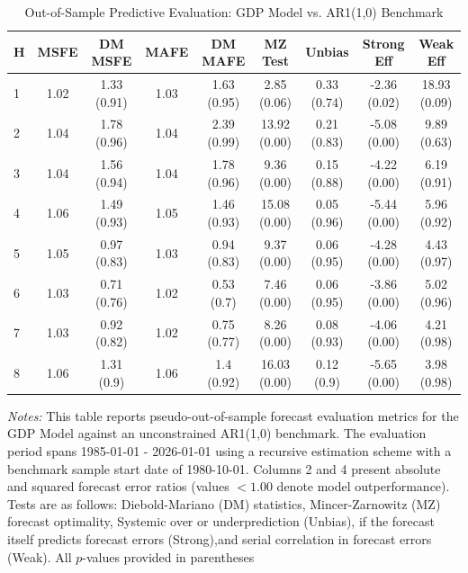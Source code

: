 \begin{table}[htbp]
\centering
\caption{Out-of-Sample Predictive Evaluation: GDP Model vs. AR1(1,0) Benchmark}
\label{tab:gdp_model_evaluation}
\footnotesize
\begin{tabular}{l cccccccc}
\hline\hline
\rule{0pt}{3ex}
\textbf{H} & \textbf{MSFE} & \textbf{DM MSFE} & \textbf{MAFE} & \textbf{DM MAFE} & \textbf{MZ Test} & \textbf{Unbias} & \textbf{Strong Eff} & \textbf{Weak Eff} \\[0.5ex]
\hline
\rule{0pt}{2.5ex}
1 & 1.02 & 1.33 (0.91) & 1.03 & 1.63 (0.95) & 2.85 (0.06) & 0.33 (0.74) & -2.36 (0.02) & 18.93 (0.09) \\
2 & 1.04 & 1.78 (0.96) & 1.04 & 2.39 (0.99) & 13.92 (0.00) & 0.21 (0.83) & -5.08 (0.00) & 9.89 (0.63) \\
3 & 1.04 & 1.56 (0.94) & 1.04 & 1.78 (0.96) & 9.36 (0.00) & 0.15 (0.88) & -4.22 (0.00) & 6.19 (0.91) \\
4 & 1.06 & 1.49 (0.93) & 1.05 & 1.46 (0.93) & 15.08 (0.00) & 0.05 (0.96) & -5.44 (0.00) & 5.96 (0.92) \\
5 & 1.05 & 0.97 (0.83) & 1.03 & 0.94 (0.83) & 9.37 (0.00) & 0.06 (0.95) & -4.28 (0.00) & 4.43 (0.97) \\
6 & 1.03 & 0.71 (0.76) & 1.02 & 0.53 (0.7) & 7.46 (0.00) & 0.06 (0.95) & -3.86 (0.00) & 5.02 (0.96) \\
7 & 1.03 & 0.92 (0.82) & 1.02 & 0.75 (0.77) & 8.26 (0.00) & 0.08 (0.93) & -4.06 (0.00) & 4.21 (0.98) \\
8 & 1.06 & 1.31 (0.9) & 1.06 & 1.4 (0.92) & 16.03 (0.00) & 0.12 (0.9) & -5.65 (0.00) & 3.98 (0.98) \\
\hline\hline
\end{tabular}%
\par\smallskip
\parbox{\textwidth}{\scriptsize \textit{Notes:} This table reports pseudo-out-of-sample forecast evaluation metrics for the GDP Model against an unconstrained AR1(1,0) benchmark. The evaluation period spans 1985-01-01 - 2026-01-01 using a recursive estimation scheme with a benchmark sample start date of 1980-10-01. Columns 2 and 4 present absolute and squared forecast error ratios (values $< 1.00$ denote model outperformance). Tests are as follows: Diebold-Mariano (DM) statistics, Mincer-Zarnowitz (MZ) forecast optimality, Systemic over or underprediction (Unbias), if the forecast itself predicts forecast errors (Strong),and serial correlation in forecast errors (Weak). All $p$-values provided in parentheses}
\end{table}
